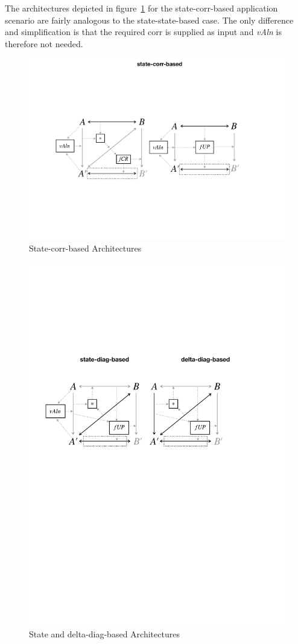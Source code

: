 The architectures depicted in figure~\ref{fig:stateCorrBased} for the state-corr-based application scenario are fairly analogous to the state-state-based case.
The only difference and simplification is that the required corr is supplied as input and \emph{vAln} is therefore not needed.
\begin{figure}[b!]
	\centering
	\includegraphics[width=\columnwidth]{diagrams/foundations/state-corr-based}
	\caption{State-corr-based Architectures}
	\label{fig:stateCorrBased}
\end{figure}
\begin{figure}[b!]
	\centering
	\includegraphics[width=0.82\columnwidth]{diagrams/foundations/state-and-delta-diag-based}
	\caption{State and delta-diag-based Architectures}
	\label{fig:stateAndDeltaBasedDiag}
\end{figure}

